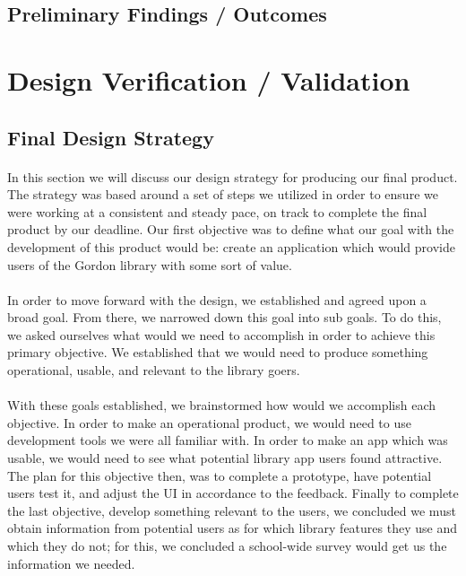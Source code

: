     
    \newpage
    \subsection{Preliminary Findings / Outcomes} %

\newpage
\section{Design Verification / Validation} %
    \newpage
    \subsection{Final Design Strategy}
    \paragraph{}
    In this section we will discuss our design strategy for producing our final product. The strategy was based around a set of steps we utilized in order to ensure we were working at a consistent and steady pace, on track to complete the final product by our deadline. Our first objective was to define what our goal with the development of this product would be: create an application which would provide users of the Gordon library with some sort of value. 
    \paragraph{}
    In order to move forward with the design, we established and agreed upon a broad goal. From there, we narrowed down this goal into sub goals. To do this, we asked ourselves what would we need to accomplish in order to achieve this primary objective. We established that we would need to produce something operational, usable, and relevant to the library goers. 
    \paragraph{}
    With these goals established, we brainstormed how would we accomplish each objective. In order to make an operational product, we would need to use development tools we were all familiar with. In order to make an app which was usable, we would need to see what potential library app users found attractive. The plan for this objective then, was to complete a prototype, have potential users test it, and adjust the UI in accordance to the feedback. Finally to complete the last objective, develop something relevant to the users, we concluded we must obtain information from potential users as for which library features they use and which they do not; for this, we concluded a school-wide survey would get us the information we needed. 
